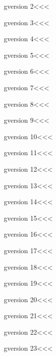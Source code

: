 \<gversion 2\><<<

\<gversion 3\><<<

\<gversion 4\><<<

\<gversion 5\><<<

\<gversion 6\><<<

\<gversion 7\><<<

\<gversion 8\><<<

\<gversion 9\><<<

\<gversion 10\><<<

\<gversion 11\><<<

\<gversion 12\><<<

\<gversion 13\><<<

\<gversion 14\><<<

\<gversion 15\><<<

\<gversion 16\><<<

\<gversion 17\><<<

\<gversion 18\><<<

\<gversion 19\><<<

\<gversion 20\><<<

\<gversion 21\><<<

\<gversion 22\><<<

\<gversion 23\><<<

